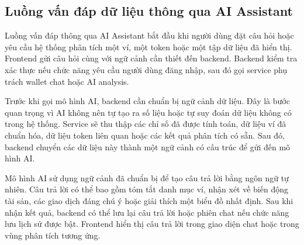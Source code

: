 
\subsection{Luồng vấn đáp dữ liệu thông qua AI Assistant}

Luồng vấn đáp thông qua AI Assistant bắt đầu khi người dùng đặt câu hỏi hoặc yêu cầu hệ thống phân tích một ví, một token hoặc một tập dữ liệu đã hiển thị. Frontend gửi câu hỏi cùng với ngữ cảnh cần thiết đến backend. Backend kiểm tra xác thực nếu chức năng yêu cầu người dùng đăng nhập, sau đó gọi service phụ trách wallet chat hoặc AI analysis.

Trước khi gọi mô hình AI, backend cần chuẩn bị ngữ cảnh dữ liệu. Đây là bước quan trọng vì AI không nên tự tạo ra số liệu hoặc tự suy đoán dữ liệu không có trong hệ thống. Service sẽ thu thập các chỉ số đã được tính toán, dữ liệu ví đã chuẩn hóa, dữ liệu token liên quan hoặc các kết quả phân tích có sẵn. Sau đó, backend chuyển các dữ liệu này thành một ngữ cảnh có cấu trúc để gửi đến mô hình AI.

Mô hình AI sử dụng ngữ cảnh đã chuẩn bị để tạo câu trả lời bằng ngôn ngữ tự nhiên. Câu trả lời có thể bao gồm tóm tắt danh mục ví, nhận xét về biến động tài sản, các giao dịch đáng chú ý hoặc giải thích một biểu đồ nhất định. Sau khi nhận kết quả, backend có thể lưu lại câu trả lời hoặc phiên chat nếu chức năng lưu lịch sử được bật. Frontend hiển thị câu trả lời trong giao diện chat hoặc trong vùng phân tích tương ứng.


